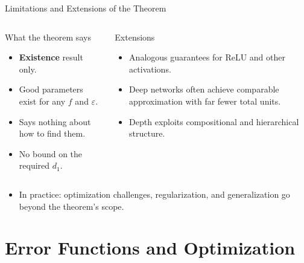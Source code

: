 \begin{frame}{Limitations and Extensions of the Theorem}
  \begin{columns}[t]
      \begin{alertblock}{What the theorem says}
        \begin{itemize}
          \item \textbf{Existence} result only.
          \item Good parameters \alert{exist} for any $f$ and $\varepsilon$.
          \item Says nothing about \alert{how to find} them.
          \item No bound on the required $d_1$.
        \end{itemize}
      \end{alertblock}
      \begin{block}{Extensions}
        \begin{itemize}
          \item Analogous guarantees for ReLU and other activations.
          \item Deep networks often achieve comparable approximation with \alert{far fewer total units}.
          \item Depth exploits compositional and hierarchical structure.
        \end{itemize}
      \end{block}
  \end{columns}
  \medskip
  \begin{itemize}
    \item In practice: optimization challenges, regularization, and generalization go beyond the theorem's scope.
  \end{itemize}
\end{frame}

\section{Error Functions and Optimization}

